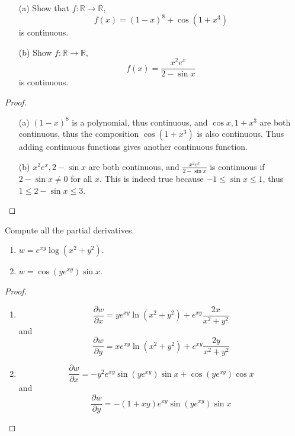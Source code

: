 \documentclass[openany]{book}
\newcommand{\R}{\mathbb{R}}
\begin{document}
\begin{prob}
    \begin{enumerate}
        \item[(a)] Show that $f:\R\to\R$,
        \begin{equation*}
            f(x)=(1-x)^8+\cos(1+x^3)
        \end{equation*}
        is continuous.
        \item[(b)] Show $f:\R\to\R$, 
        \begin{equation*}
            f(x)=\frac{x^2e^x}{2-\sin x}
        \end{equation*}
        is continuous.
    \end{enumerate}
\end{prob}
\begin{proof}
    \begin{enumerate}
        \item[(a)] $(1-x)^8$ is a polynomial, thus continuous, and $\cos x, 1+x^3$ are both continuous, thus the composition $\cos(1+x^3)$ is also continuous. Thus adding continuous functions gives another continuous function.
        \item[(b)] $x^2e^x, 2-\sin x$ are both continuous, and $\frac{x^2e^x}{2-\sin x}$ is continuous if $2-\sin x\neq 0$ for all $x$. This is indeed true because $-1\leq\sin x\leq 1$, thus $1\leq 2-\sin x\leq 3$.
    \end{enumerate}
\end{proof}


\begin{prob}
    Compute all the partial derivatives.
    \begin{enumerate}
        \item $w=e^{xy}\log(x^2+y^2)$.
        \item $w=\cos(ye^{xy})\sin x$.
    \end{enumerate}
\end{prob}
\begin{proof}
    \begin{enumerate}
        \item \begin{equation*}
            \frac{\partial w}{\partial x}=ye^{xy}\ln(x^2+y^2)+e^{xy}\frac{2x}{x^2+y^2}
        \end{equation*}
        and 
        \begin{equation*}
            \frac{\partial w}{\partial y}=xe^{xy}\ln(x^2+y^2)+e^{xy}\frac{2y}{x^2+y^2}
        \end{equation*}
        \item \begin{equation*}
            \frac{\partial w}{\partial x}=-y^2e^{xy}\sin (ye^{xy})\sin x+\cos(ye^{xy})\cos x
        \end{equation*}
        and 
        \begin{equation*}
            \frac{\partial w}{\partial y}=-(1+xy)e^{xy}\sin(ye^{xy})\sin x
        \end{equation*}
    \end{enumerate}
\end{proof}
\end{document}

